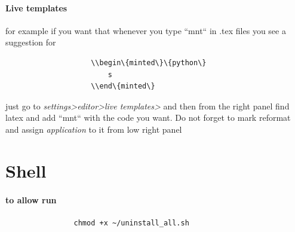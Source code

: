             \paragraph{Live templates}
                for example if you want that whenever you type ``mnt`` in .tex files you see a suggestion for
                \begin{verbatim}
                    \\begin\{minted\}\{python\}
                        s
                    \\end\{minted\}
                \end{verbatim}
                just go to \textit{settings>editor>live templates>}
                    and then from the right panel find latex and add ``mnt`` with the code you want. Do not forget to mark reformat and assign \textit{application} to it from low right panel
                    
\section{Shell}
    \paragraph{to allow run}
            \begin{verbatim}
                chmod +x ~/uninstall_all.sh
            \end{verbatim}
                
        
    